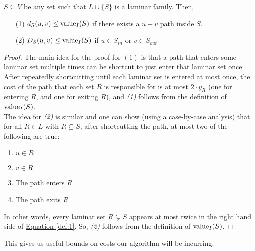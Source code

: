 	\begin{lemma}\label{lemm:2:D-val} 
		$S\subseteq V$ be any set such that $L\cup \{S\}$ is a laminar family. 
		Then,
		\begin{enumerate}
			\item[(1)] $d_S(u,v)\leq \textup{value}_I(S)$ if there exists a $u-v$ path inside $S$.
			\item[(2)] $D_S(u,v)\leq \textup{value}_I(S)$ if $u\in S_{in}$ or $v\in S_{out}$
		\end{enumerate}
	\end{lemma}
	\begin{proof}
		The main idea for the proof for $(1)$ is that a path that enters some laminar set multiple times can be shortcut to just enter that laminar set once. 
		After repeatedly shortcutting until each laminar set is entered at most once, the cost of the path that each set $R$ is responsible for is at most $2\cdot y_R$ (one for entering $R$, and one for exiting $R$), and \textit{(1)} follows from the \hyperref[def:value]{definition of $\textup{value}_I(S)$}.\\
		The idea for \textit{(2)} is similar and one can show (using a case-by-case analysis) that for all $R\in L$ with $R\subsetneq S$, after shortcutting the path, at most two of the following are true:
		\begin{enumerate}
			\item $u\in R$
			\item $v\in R$
			\item The path enters $R$
			\item The path exits $R$
		\end{enumerate}
		In other words, every laminar set $R\subsetneq S$ appears at most twice in the right hand side of \hyperref[def:1]{Equation \ref{def:1}}. So, \textit{(2)} follows from the definition of $\textup{value}_I(S)$.
	\end{proof}
	
	This gives us useful bounds on costs our algorithm will be incurring.


